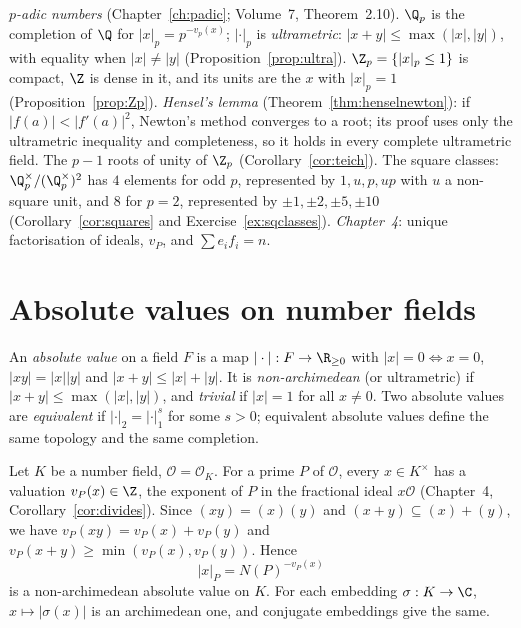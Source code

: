 \begin{reminder}
\emph{$p$-adic numbers} (Chapter~\ref{ch:padic}; Volume~7, Theorem~2.10). $\Q_p$ is the completion of $\Q$ for
$|x|_p=p^{-v_p(x)}$; $|\cdot|_p$ is \emph{ultrametric}: $|x+y|\le\max(|x|,|y|)$, with equality when $|x|\ne|y|$
(Proposition~\ref{prop:ultra}). $\Z_p=\{|x|_p\le1\}$ is compact, $\Z$ is dense in it, and its units are the $x$ with $|x|_p=1$
(Proposition~\ref{prop:Zp}).
\emph{Hensel's lemma} (Theorem~\ref{thm:henselnewton}): if $|f(a)|<|f'(a)|^2$, Newton's method converges to a root; its proof uses only
the ultrametric inequality and completeness, so it holds in every complete ultrametric field. The $p-1$ roots of unity of
$\Z_p$ (Corollary~\ref{cor:teich}). The square classes: $\Q_p^\times/(\Q_p^\times)^2$ has $4$ elements for odd $p$, represented by
$1,u,p,up$ with $u$ a non-square unit, and $8$ for $p=2$, represented by $\pm1,\pm2,\pm5,\pm10$ (Corollary~\ref{cor:squares} and Exercise~\ref{ex:sqclasses}).
\emph{Chapter~4}: unique factorisation of ideals, $v_P$, and $\sum e_if_i=n$.
\end{reminder}

\section{Absolute values on number fields}

An \emph{absolute value} on a field $F$ is a map $|\cdot|:F\to\R_{\ge0}$ with $|x|=0\iff x=0$, $|xy|=|x||y|$ and
$|x+y|\le|x|+|y|$. It is \emph{non-archimedean} (or ultrametric) if $|x+y|\le\max(|x|,|y|)$, and \emph{trivial} if $|x|=1$
for all $x\ne0$. Two absolute values are \emph{equivalent} if $|\cdot|_2=|\cdot|_1^s$ for some $s>0$; equivalent absolute values
define the same topology and the same completion.

Let $K$ be a number field, $\mathcal O=\mathcal O_K$. For a prime $P$ of $\mathcal O$, every $x\in K^\times$ has a valuation
$v_P(x)\in\Z$, the exponent of $P$ in the fractional ideal $x\mathcal O$ (Chapter~4, Corollary~\ref{cor:divides}). Since
$(xy)=(x)(y)$ and $(x+y)\subseteq(x)+(y)$, we have $v_P(xy)=v_P(x)+v_P(y)$ and $v_P(x+y)\ge\min(v_P(x),v_P(y))$. Hence
\[
|x|_P=N(P)^{-v_P(x)}
\]
is a non-archimedean absolute value on $K$. For each embedding $\sigma:K\to\C$, $x\mapsto|\sigma(x)|$ is an archimedean one,
and conjugate embeddings give the same.

